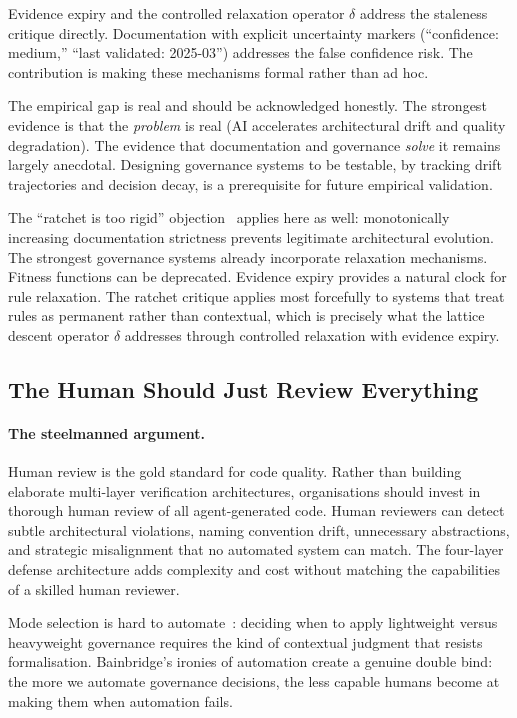 \documentclass[11pt, a4paper, logo, copyright]{googledeepmind}
\begin{document}
Evidence expiry and the controlled relaxation operator $\delta$ address the staleness critique directly. Documentation with explicit uncertainty markers (``confidence: medium,'' ``last validated: 2025-03'') addresses the false confidence risk. The contribution is making these mechanisms formal rather than ad hoc.

The empirical gap is real and should be acknowledged honestly. The strongest evidence is that the \emph{problem} is real (AI accelerates architectural drift and quality degradation). The evidence that documentation and governance \emph{solve} it remains largely anecdotal. Designing governance systems to be testable, by tracking drift trajectories and decision decay, is a prerequisite for future empirical validation.

The ``ratchet is too rigid'' objection~\citep{ford2017} applies here as well: monotonically increasing documentation strictness prevents legitimate architectural evolution. The strongest governance systems already incorporate relaxation mechanisms. Fitness functions can be deprecated. Evidence expiry provides a natural clock for rule relaxation. The ratchet critique applies most forcefully to systems that treat rules as permanent rather than contextual, which is precisely what the lattice descent operator $\delta$ addresses through controlled relaxation with evidence expiry.


\subsection{The Human Should Just Review Everything}
\label{sec:contrarian-human}

\paragraph{The steelmanned argument.}
Human review is the gold standard for code quality. Rather than building elaborate multi-layer verification architectures, organisations should invest in thorough human review of all agent-generated code. Human reviewers can detect subtle architectural violations, naming convention drift, unnecessary abstractions, and strategic misalignment that no automated system can match. The four-layer defense architecture adds complexity and cost without matching the capabilities of a skilled human reviewer.

Mode selection is hard to automate~\citep{bainbridge1983ironies}: deciding when to apply lightweight versus heavyweight governance requires the kind of contextual judgment that resists formalisation. Bainbridge's ironies of automation create a genuine double bind: the more we automate governance decisions, the less capable humans become at making them when automation fails.
\end{document}
